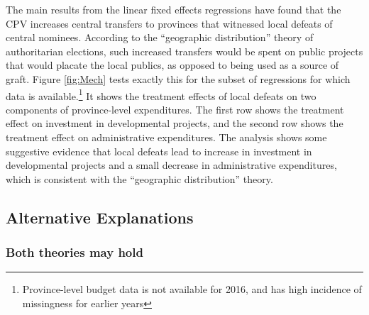 \documentclass[12pt]{article}\usepackage[]{graphicx}\usepackage[]{color}
\newcommand{\1}{\mathbbm{1}}
\begin{document}
The main results from the linear fixed effects regressions have found that the CPV increases central transfers to provinces that witnessed local defeats of central nominees. According to the ``geographic distribution'' theory of authoritarian elections, such increased transfers would be spent on public projects that would placate the local publics, as opposed to being used as a source of graft. Figure \ref{fig:Mech} tests exactly this for the subset of regressions for which data is available.\footnote{Province-level budget data is not available for 2016, and has high incidence of missingness for earlier years} It shows the treatment effects of local defeats on two components of province-level expenditures. The first row shows the treatment effect on investment in developmental projects, and the second row shows the treatment effect on administrative expenditures. The analysis shows some suggestive evidence that local defeats lead to increase in investment in developmental projects and a small decrease in administrative expenditures, which is consistent with the ``geographic distribution'' theory.


\subsection{Alternative Explanations}

\subsubsection{Both theories may hold}
\end{document}
